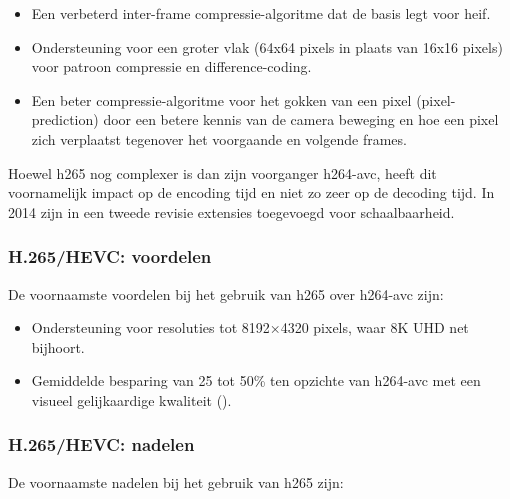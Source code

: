 \begin{itemize}
	
	\item Een verbeterd \gls{inter-frame} \gls{compressie-algoritme} dat de basis legt voor \gls{heif}.
	
	\item Ondersteuning voor een groter vlak (64x64 \glspl{pixel} in plaats van 16x16 \glspl{pixel}) voor patroon compressie en difference-coding.
	
	\item Een beter \gls{compressie-algoritme} voor het gokken van een \gls{pixel} (\gls{pixel-prediction}) door een betere kennis van de camera beweging en hoe een \gls{pixel} zich verplaatst tegenover het voorgaande en volgende \glspl{frame}.
	
\end{itemize}

Hoewel \gls{h265} nog complexer is dan zijn voorganger \gls{h264-avc}, heeft dit voornamelijk impact op de \gls{encoding} tijd en niet zo zeer op de \gls{decoding} tijd. In 2014 zijn in een tweede revisie extensies toegevoegd voor schaalbaarheid.

\subsubsection{H.265/HEVC: voordelen}
\label{sec:videocompressie-h265-voordelen}

De voornaamste voordelen bij het gebruik van \gls{h265} over \gls{h264-avc} zijn:

\begin{itemize}
	
	\item Ondersteuning voor resoluties tot 8192×4320 \glspl{pixel}, waar 8K UHD net bijhoort.
	
	\item Gemiddelde besparing van 25 tot 50\%  ten opzichte van \gls{h264-avc} met een visueel gelijkaardige kwaliteit (\cite{h262h264h265vergelijking}).
	
\end{itemize}

\subsubsection{H.265/HEVC: nadelen}
\label{sec:videocompressie-h265-nadelen}

De voornaamste nadelen bij het gebruik van \gls{h265} zijn:

